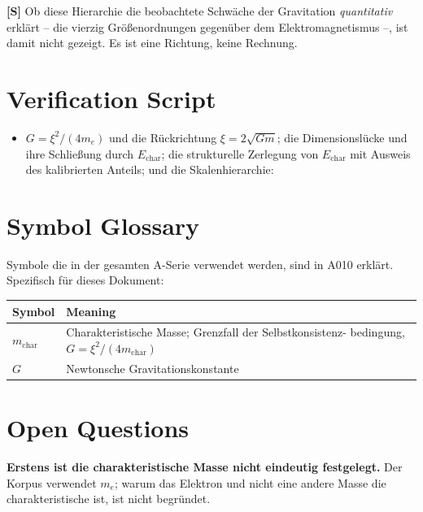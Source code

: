 \textbf{[S]} Ob diese Hierarchie die beobachtete Schwäche der Gravitation
\emph{quantitativ} erklärt -- die vierzig Größenordnungen gegenüber dem
Elektromagnetismus --, ist damit nicht gezeigt. Es ist eine Richtung, keine
Rechnung.

\section{Verification Script}

\begin{itemize}
  \item $G=\xi^2/(4m_e)$ und die Rückrichtung $\xi=2\sqrt{Gm}$; die
    Dimensionslücke und ihre Schließung durch $E_\text{char}$; die
    strukturelle Zerlegung von $E_\text{char}$ mit Ausweis des kalibrierten
    Anteils; und die Skalenhierarchie:
\end{itemize}


\section{Symbol Glossary}

Symbole die in der gesamten A-Serie verwendet werden, sind in A010 erklärt.
Spezifisch für dieses Dokument:

\begin{center}
\renewcommand{\arraystretch}{1.3}
{\small\begin{tabular}{lp{9cm}}
\toprule
Symbol & Meaning \\
\midrule
$m_\text{char}$ & Charakteristische Masse; Grenzfall der Selbstkonsistenz-
  bedingung, $G = \xi^2/(4m_\text{char})$ \\
$G$ & Newtonsche Gravitationskonstante \\
\bottomrule
\end{tabular}}
\renewcommand{\arraystretch}{1.0}
\end{center}

\section{Open Questions}

\textbf{Erstens ist die charakteristische Masse nicht eindeutig festgelegt.} Der
Korpus verwendet $m_e$; warum das Elektron und nicht eine andere Masse die
charakteristische ist, ist nicht begründet.

